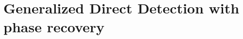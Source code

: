 \chapter{Generalized Direct Detection with phase recovery}
\newcommand{\PlabstImage}[1]{images/Plabst/#1}





